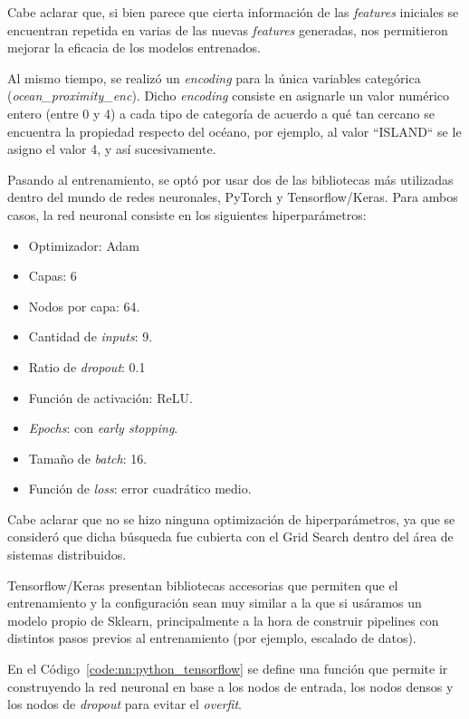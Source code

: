 \documentclass[11pt]{article}
\newcommand{\english}[1]{\textit{#1}}
\begin{document}
Cabe aclarar que, si bien parece que cierta información de las \english{features} iniciales se encuentran repetida en varias de las nuevas \english{features} generadas, nos permitieron mejorar la eficacia de los modelos entrenados.

Al mismo tiempo, se realizó un \english{encoding} para la única variables categórica (\english{ocean\_proximity\_enc}). Dicho \english{encoding} consiste en asignarle un valor numérico entero (entre 0 y 4) a cada tipo de categoría de acuerdo a qué tan cercano se encuentra la propiedad respecto del océano, por ejemplo, al valor ``ISLAND`` se le asigno el valor 4, y así sucesivamente.

Pasando al entrenamiento, se optó por usar dos de las bibliotecas más utilizadas dentro del mundo de redes neuronales, PyTorch y Tensorflow/Keras. Para ambos casos, la red neuronal consiste en los siguientes hiperparámetros:

\begin{itemize}
    \item Optimizador: Adam
    \item Capas: 6
    \item Nodos por capa: 64.
    \item Cantidad de \english{inputs}: 9.
    \item Ratio de \english{dropout}: 0.1
    \item Función de activación: ReLU.
    \item \english{Epochs}:  con \english{early stopping}.
    \item Tamaño de \english{batch}: 16.
    \item Función de \english{loss}: error cuadrático medio.
\end{itemize}

Cabe aclarar que no se hizo ninguna optimización de hiperparámetros, ya que se consideró que dicha búsqueda fue cubierta con el Grid Search dentro del área de sistemas distribuidos.

Tensorflow/Keras presentan bibliotecas accesorias que permiten que el entrenamiento y la configuración sean muy similar a la que si usáramos un modelo propio de Sklearn, principalmente a la hora de construir pipelines con distintos pasos previos al entrenamiento (por ejemplo, escalado de datos).

En el Código~\ref{code:nn:python_tensorflow} se define una función que permite ir construyendo la red neuronal en base a los nodos de entrada, los nodos densos y los nodos de \english{dropout} para evitar el \english{overfit}.
\end{document}
